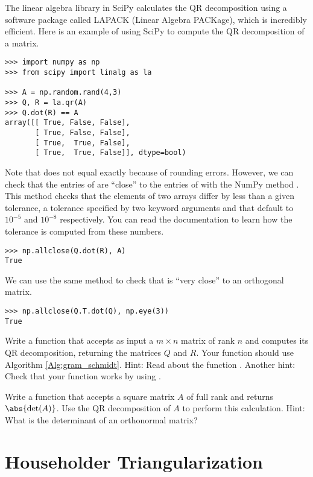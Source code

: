 The linear algebra library in SciPy calculates the QR decomposition using a software package called LAPACK (Linear Algebra PACKage), which is incredibly efficient.
Here is an example of using SciPy to compute the QR decomposition of a matrix.

\begin{lstlisting}
>>> import numpy as np
>>> from scipy import linalg as la

>>> A = np.random.rand(4,3)
>>> Q, R = la.qr(A)
>>> Q.dot(R) == A
array([[ True, False, False],
       [ True, False, False],
       [ True,  True, False],
       [ True,  True, False]], dtype=bool)
\end{lstlisting}
 Note that  does not equal  exactly because of rounding errors.
 However, we can check that the entries of  are ``close'' to the entries of  with the NumPy method .
 This method checks that the elements of two arrays differ by less than a given tolerance, a tolerance specified by two keyword arguments  and  that default to $10^{-5}$ and $10^{-8}$ respectively.
 You can read the documentation to learn how the tolerance is computed from these numbers.
\begin{lstlisting}
>>> np.allclose(Q.dot(R), A)
True
\end{lstlisting}
We can use the same method to check that  is ``very close'' to an orthogonal matrix.
\begin{lstlisting}
>>> np.allclose(Q.T.dot(Q), np.eye(3))
True
\end{lstlisting}


\begin{problem} %
Write a function that accepts as input a $m \times n$ matrix of rank $n$ and computes its QR decomposition, returning the matrices $Q$ and $R$.
Your function should use Algorithm \ref{Alg:gram_schmidt}.
Hint: Read about the function .
Another hint: Check that your function works by using .
\end{problem}

\begin{problem} %
Write a function that accepts a square matrix $A$ of full rank and returns $\abs{\det(A)}$.
Use the QR decomposition of $A$ to perform this calculation.
Hint: What is the determinant of an orthonormal matrix?
\end{problem}

\section*{Householder Triangularization} %

